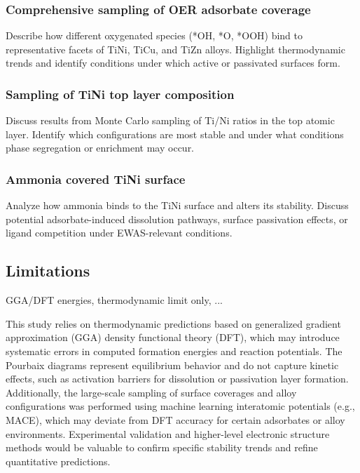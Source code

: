 \subsubsection{Comprehensive sampling of OER adsorbate coverage}
Describe how different oxygenated species (*OH, *O, *OOH) bind to representative facets of TiNi, TiCu, and TiZn alloys. Highlight thermodynamic trends and identify conditions under which active or passivated surfaces form.

\subsubsection{Sampling of TiNi top layer composition}
Discuss results from Monte Carlo sampling of Ti/Ni ratios in the top atomic layer. Identify which configurations are most stable and under what conditions phase segregation or enrichment may occur.

\subsubsection{Ammonia covered TiNi surface}
Analyze how ammonia binds to the TiNi surface and alters its stability. Discuss potential adsorbate-induced dissolution pathways, surface passivation effects, or ligand competition under EWAS-relevant conditions.



\subsection{Limitations}
GGA/DFT energies, thermodynamic limit only, ...

This study relies on thermodynamic predictions based on generalized gradient approximation (GGA) density functional theory (DFT), which may introduce systematic errors in computed formation energies and reaction potentials. The Pourbaix diagrams represent equilibrium behavior and do not capture kinetic effects, such as activation barriers for dissolution or passivation layer formation. Additionally, the large-scale sampling of surface coverages and alloy configurations was performed using machine learning interatomic potentials (e.g., MACE), which may deviate from DFT accuracy for certain adsorbates or alloy environments. Experimental validation and higher-level electronic structure methods would be valuable to confirm specific stability trends and refine quantitative predictions.



